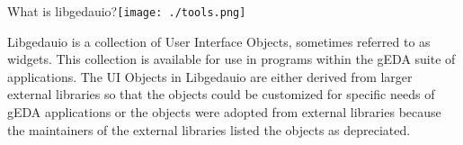   What is libgedauio?\texttt{[image: ./tools.png]}

  Libgedauio is a collection of User Interface Objects, sometimes referred to as widgets.
  This collection is available for use in programs within the gEDA suite of applications.
  The UI Objects in Libgedauio are either derived from larger external libraries so
  that the objects could be customized for specific needs of gEDA applications or the
  objects were adopted from external libraries because the maintainers of the external
  libraries listed the objects as depreciated.

